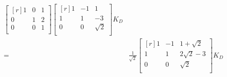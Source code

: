 \documentclass[../main.tex]{subfiles}
\begin{document}
\begin{enumerate}[a)]
\begin{align*}
\begin{bmatrix*}[r]
				1 & 0 & 1 \\
				0 & 1 & 2 \\
				0 & 0 & 1 \\
			\end{bmatrix*}
			\begin{bmatrix*}[r]
				1 & -1 & 1 \\
				1 & 1 & -3 \\
				0 & 0 & \sqrt{2} \\
			\end{bmatrix*}
			K_D
			\\=&
			\frac{1}{\sqrt{2}}
			\begin{bmatrix*}[r]
				1 & -1 & 1 + \sqrt{2} \\
				1 & 1 & 2\sqrt{2} - 3 \\
				0 & 0 & \sqrt{2} \\
			\end{bmatrix*}
			K_D
		\end{align*}
\end{enumerate}
\end{document}
